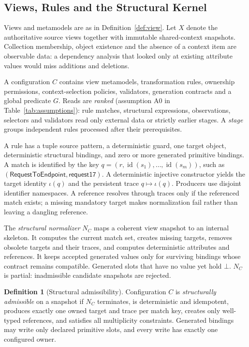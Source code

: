 \documentclass[10pt,journal,compsoc]{IEEEtran}
\theoremstyle{plain}
\theoremstyle{definition}
\newtheorem{definition}{Definition}
\newcommand{\nodata}{\bot}
\begin{document}
\subsection{Views, Rules and the Structural Kernel}
Views and metamodels are as in Definition~\ref{def:view}. Let $X$ denote the authoritative source views together with immutable shared-context snapshots. Collection membership, object existence and the absence of a context item are observable data: a dependency analysis that looked only at existing attribute values would miss additions and deletions.

A configuration $C$ contains view metamodels, transformation rules, ownership permissions, context-selection policies, validators, generation contracts and a global predicate $G$. Reads are \emph{ranked} (assumption A0 in Table~\ref{tab:assumptions}): rule matches, structural expressions, observations, selectors and validators read only external data or strictly earlier stages. A \emph{stage} groups independent rules processed after their prerequisites.

A rule has a tuple source pattern, a deterministic guard, one target object, deterministic structural bindings, and zero or more generated primitive bindings. A match is identified by the key $q=(r,\operatorname{id}(s_1),\ldots,\operatorname{id}(s_m))$, such as $(\mathsf{RequestToEndpoint},\mathsf{request17})$. A deterministic injective constructor yields the target identity $\iota(q)$ and the persistent trace $q\mapsto\iota(q)$. Producers use disjoint identifier namespaces. A reference resolves through traces only if the referenced match exists; a missing mandatory target makes normalization fail rather than leaving a dangling reference.

The \emph{structural normalizer} $N_C$ maps a coherent view snapshot to an internal skeleton. It computes the current match set, creates missing targets, removes obsolete targets and their traces, and computes deterministic attributes and references. It keeps accepted generated values only for surviving bindings whose contract remains compatible. Generated slots that have no value yet hold $\nodata$. $N_C$ is partial: inadmissible candidate snapshots are rejected.

\begin{definition}[Structural admissibility]\label{def:struct}
Configuration $C$ is \emph{structurally admissible} on a snapshot if $N_C$ terminates, is deterministic and idempotent, produces exactly one owned target and trace per match key, creates only well-typed references, and satisfies all multiplicity constraints. Generated bindings may write only declared primitive slots, and every write has exactly one configured owner.
\end{definition}
\end{document}
